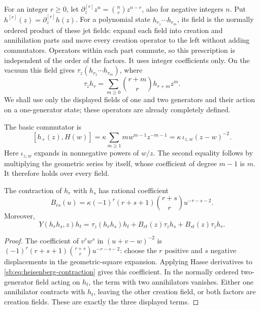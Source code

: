 For an integer \(r\ge0\), let
\(\partial_z^{[r]}z^n=\binom nr z^{n-r}\), also for negative
integers \(n\).  Put
\(h^{[r]}(z)=\partial_z^{[r]}h(z)\).
For a polynomial state \(h_{r_1}\cdots h_{r_m}\), its field
is the normally ordered product of these jet fields: expand each
field into creation and annihilation parts and move every creation
operator to the left without adding commutators.  Operators within
each part commute, so this prescription is independent of the order
of the factors.  It uses integer coefficients only.
On the vacuum this field gives \(\tau_z(h_{r_1}\cdots h_{r_m})\), where
\[
 \tau_z h_r=\sum_{m\ge0}\binom{r+m}{r}h_{r+m}z^m.
\]
We shall use only the displayed fields of one and two generators and their
action on a one-generator state; these operators are already completely defined.

The basic commutator is
\begin{equation}\label{sb:eq:heisenberg-contraction}
 [h_+(z),H(w)]
 =\kappa\sum_{m\ge1}m w^{m-1}z^{-m-1}
 =\kappa\,\iota_{z,w}(z-w)^{-2}.
\end{equation}
Here \(\iota_{z,w}\) expands in nonnegative powers of \(w/z\).
The second equality follows by multiplying the geometric series by
itself, whose coefficient of degree \(m-1\) is \(m\).
It therefore holds over every field.

\begin{lemma}\label{sb:lem:heisenberg-jets}
The contraction of \(h_r\) with \(h_s\) has rational coefficient
\begin{equation}\label{sb:eq:heisenberg-kernel}
 B_{rs}(u)=\kappa(-1)^r(r+s+1)\binom{r+s}{r}u^{-r-s-2}.
\end{equation}
Moreover,
\[
 Y(h_rh_s,z)h_t
 =\tau_z(h_rh_s)h_t
   +B_{rt}(z)\tau_z h_s+B_{st}(z)\tau_z h_r.
\]
\end{lemma}

\begin{proof}
The coefficient of \(v^rw^s\) in \((u+v-w)^{-2}\) is
\((-1)^r(r+s+1)\binom{r+s}{r}u^{-r-s-2}\): choose the
\(r\) positive and \(s\) negative displacements in the
geometric-square expansion.  Applying Hasse derivatives to
\eqref{sb:eq:heisenberg-contraction} gives this coefficient.
In the normally ordered two-generator field acting on \(h_t\),
the term with two annihilators vanishes.  Either one annihilator
contracts with \(h_t\), leaving the other creation field, or both
factors are creation fields.  These are exactly the three displayed terms.
\end{proof}

